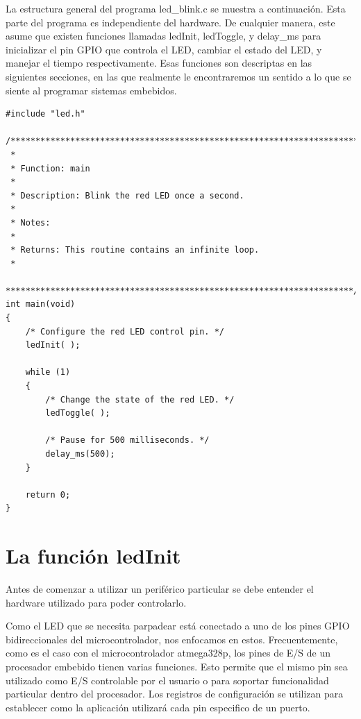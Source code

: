 \documentclass[12pt]{article}
\begin{document}
La estructura general del programa led\_blink.c se muestra a continuación.
Esta parte del programa es independiente del hardware. De cualquier manera,
este asume que existen funciones llamadas ledInit, ledToggle, y delay\_ms
para inicializar el pin GPIO que controla el LED, cambiar el estado del LED,
y manejar el tiempo respectivamente. Esas funciones son descriptas en las 
siguientes secciones, en las que realmente le encontraremos un
sentido a lo que se siente al programar sistemas embebidos.

\begin{verbatim}
#include "led.h"

/**********************************************************************
 *
 * Function: main
 *
 * Description: Blink the red LED once a second.
 *
 * Notes:
 *
 * Returns: This routine contains an infinite loop.
 *
 **********************************************************************/
int main(void)
{
    /* Configure the red LED control pin. */
    ledInit( );

    while (1)
    {
        /* Change the state of the red LED. */
        ledToggle( );

        /* Pause for 500 milliseconds. */
        delay_ms(500);
    }

    return 0;
}
\end{verbatim}

\section *{La función ledInit}

Antes de comenzar a utilizar un periférico particular se debe entender el 
hardware utilizado para poder controlarlo.


Como el LED que se necesita parpadear está conectado a uno de los pines
GPIO bidireccionales del microcontrolador, nos enfocamos en estos.
Frecuentemente, como es el caso con el microcontrolador atmega328p, los
pines de E/S de un procesador embebido tienen varias funciones.
Esto permite que el mismo pin sea utilizado como E/S controlable por el usuario
o para soportar funcionalidad particular dentro del procesador.
Los registros de configuración se utilizan para establecer como la aplicación
utilizará cada pin especifico de un puerto.
\end{document}
